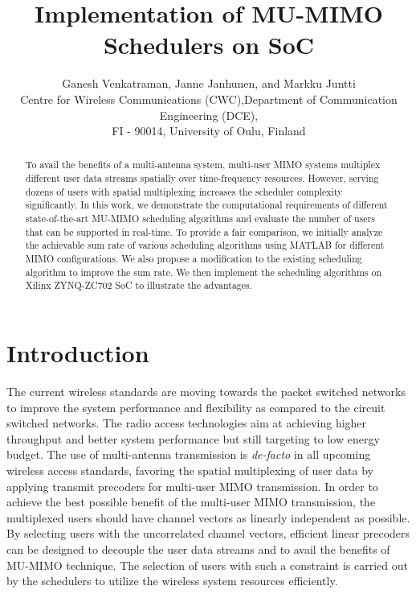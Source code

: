 \documentclass[conference,letterpaper,10pt]{./../../IEEE/IEEEtran}
\begin{document}
\title{Implementation of MU-MIMO Schedulers on SoC}

\author{\begin{tabular}{cc}
\multicolumn{2}{c}{Ganesh Venkatraman, Janne Janhunen, and Markku Juntti}\\
Centre for Wireless Communications (CWC), & Department of Communication Engineering (DCE), \\
\multicolumn{2}{c}{FI - 90014, University of Oulu, Finland}\\
\end{tabular}}

\maketitle

\begin{abstract}
To avail the benefits of a multi-antenna system, multi-user \ac{MIMO} systems multiplex different user data streams spatially over time-frequency resources. However, serving dozens of users with spatial multiplexing increases the scheduler complexity significantly. In this work, we demonstrate the computational requirements of different state-of-the-art MU-MIMO scheduling algorithms and evaluate the number of users that can be supported in real-time. To provide a fair comparison, we initially analyze the achievable sum rate of various scheduling algorithms using MATLAB for different MIMO configurations. We also propose a modification to the existing scheduling algorithm to improve the sum rate. We then implement the scheduling algorithms on Xilinx ZYNQ-ZC702 \ac{SoC} to illustrate the advantages.
\end{abstract}

\acresetall
\section{Introduction}
The current wireless standards are moving towards the packet switched networks to improve the system performance and flexibility as compared to the circuit switched networks. The radio access technologies aim at achieving higher throughput and better system performance but still targeting to low energy budget. The use of multi-antenna transmission is \textit{de-facto} in all upcoming wireless access standards, favoring the spatial multiplexing of user data by applying transmit precoders for multi-user \ac{MIMO} transmission. In order to achieve the best possible benefit of the multi-user \ac{MIMO} transmission, the multiplexed users should have channel vectors as linearly independent as possible. 
By selecting users with the uncorrelated channel vectors, efficient linear precoders can be designed to decouple the user data streams and to avail the benefits of MU-MIMO technique. The selection of users with such a constraint is carried out by the schedulers to utilize the wireless system resources efficiently.
\end{document}
